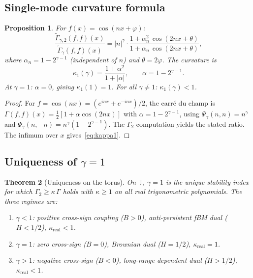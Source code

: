 \documentclass[11pt,a4paper]{article}
\theoremstyle{plain}
\newtheorem{theorem}{Theorem}[section]
\newtheorem{proposition}[theorem]{Proposition}
\theoremstyle{definition}
\theoremstyle{remark}
\newcommand{\T}{\mathbb{T}}
\begin{document}
\subsection{Single-mode curvature formula}

\begin{proposition}\label{prop:single-mode}
For $f(x) = \cos(nx + \varphi)$:
\begin{equation}\label{eq:single-mode}
  \frac{\widetilde{\Gamma}_{\gamma,2}(f,f)(x)}
       {\widetilde{\Gamma}_\gamma(f,f)(x)}
  = |n|^\gamma \cdot
  \frac{1 + \alpha_n^2\,\cos(2nx+\theta)}
       {1 + \alpha_n\,\cos(2nx+\theta)},
\end{equation}
where $\alpha_n = 1 - 2^{\gamma-1}$ (independent of $n$)
and $\theta = 2\varphi$. The curvature is
\begin{equation}\label{eq:kappa1}
  \kappa_1(\gamma) = \frac{1 + \alpha^2}{1 + |\alpha|},
  \qquad \alpha = 1 - 2^{\gamma-1}.
\end{equation}
At $\gamma = 1$: $\alpha = 0$, giving $\kappa_1(1) = 1$.
For all $\gamma \neq 1$: $\kappa_1(\gamma) < 1$.
\end{proposition}

\begin{proof}
For $f = \cos(nx) = (e^{inx} + e^{-inx})/2$, the carr\'e du champ is
$\Gamma(f,f)(x) = \tfrac{1}{2}[1 + \alpha\cos(2nx)]$
with $\alpha = 1 - 2^{\gamma-1}$,
using $\Psi_\gamma(n,n) = n^\gamma$ and
$\Psi_\gamma(n,-n) = n^\gamma(1 - 2^{\gamma-1})$.
The $\Gamma_2$ computation yields the stated ratio.
The infimum over $x$ gives~\eqref{eq:kappa1}.
\end{proof}


\subsection{Uniqueness of $\gamma = 1$}

\begin{theorem}[Uniqueness on the torus]\label{thm:uniqueness}
On $\T$, $\gamma = 1$ is the unique stability index for which
$\Gamma_2 \geq \kappa\,\Gamma$ holds with $\kappa \geq 1$
on all real trigonometric polynomials. The three regimes are:
\begin{enumerate}[label=(\roman*)]
\item $\gamma < 1$: positive cross-sign coupling ($B > 0$),
  anti-persistent fBM dual ($H < 1/2$), $\kappa_{\mathrm{real}} < 1$.
\item $\gamma = 1$: zero cross-sign ($B = 0$),
  Brownian dual ($H = 1/2$), $\kappa_{\mathrm{real}} = 1$.
\item $\gamma > 1$: negative cross-sign ($B < 0$),
  long-range dependent dual ($H > 1/2$), $\kappa_{\mathrm{real}} < 1$.
\end{enumerate}
\end{theorem}
\end{document}
